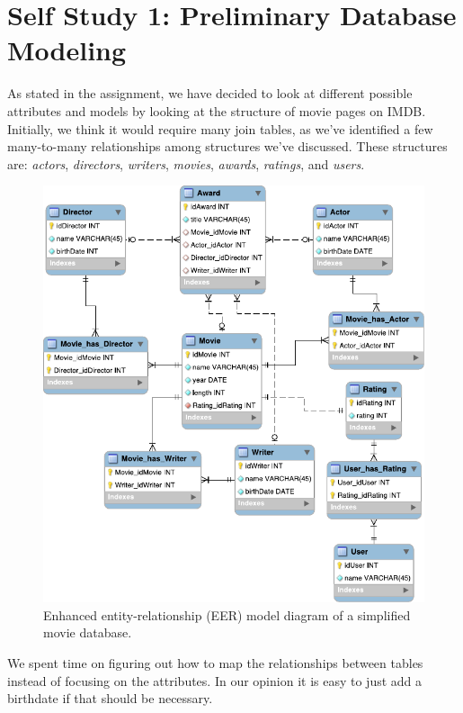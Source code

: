 \section{Self Study 1: Preliminary Database Modeling}

As stated in the assignment, we have decided to look at different possible attributes and models by looking at the structure of movie pages on IMDB\@. Initially, we think it would require many join tables, as we've identified a few many-to-many relationships among structures we've discussed. These structures are: \emph{actors}, \emph{directors}, \emph{writers}, \emph{movies}, \emph{awards}, \emph{ratings}, and \emph{users}.

\begin{figure}[h]
  \centering
  \includegraphics[width=\linewidth]{1-06.02.14/selfStudy1db.pdf}
  \caption{Enhanced entity-relationship (EER) model diagram of a simplified movie database.}\label{fig:model}
\end{figure}

We spent time on figuring out how to map the relationships between tables
instead of focusing on the attributes. In our opinion it is easy to just add a
birthdate if that should be necessary.

